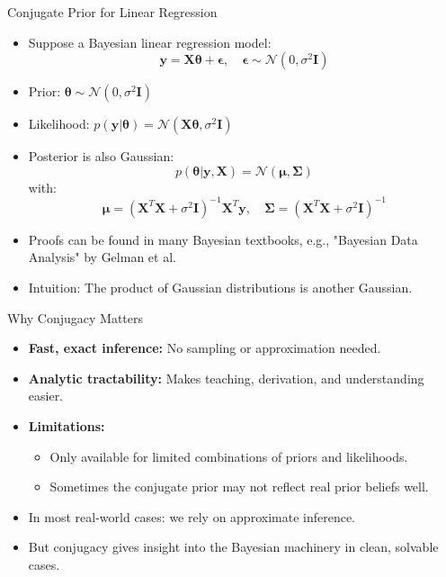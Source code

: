 \documentclass{beamer}
\begin{document}
\begin{frame}{Conjugate Prior for Linear Regression}
  \begin{itemize}
    \item Suppose a Bayesian linear regression model:
      \[
        \bm{y} = \bm{X}\bm{\theta} + \bm{\epsilon}, \quad \bm{\epsilon} \sim \mathcal{N}(0, \sigma^2 \bm{I})
      \]
    \item Prior: \( \bm{\theta} \sim \mathcal{N}(0, \sigma^2 \bm{I}) \)
    \item Likelihood: \( p(\bm{y} | \bm{\theta}) = \mathcal{N}(\bm{X}\bm{\theta}, \sigma^2 \bm{I}) \)
    \item Posterior is also Gaussian:
      \[
        p(\bm{\theta} | \bm{y}, \bm{X}) = \mathcal{N}(\bm{\mu}, \bm{\Sigma})
      \]
      with:
      \[
        \bm{\mu} = (\bm{X}^T \bm{X} + \sigma^2 \bm{I})^{-1} \bm{X}^T \bm{y}, \quad
        \bm{\Sigma} = (\bm{X}^T \bm{X} + \sigma^2 \bm{I})^{-1}
      \]
    \end{itemize}
    \begin{itemize}
    \item Proofs can be found in many Bayesian textbooks, e.g., "Bayesian Data Analysis" by Gelman et al.
    \item{Intuition:} The product of Gaussian distributions is another Gaussian.
      \end{itemize}
\end{frame}

\begin{frame}{Why Conjugacy Matters}
  \begin{itemize}
    \item \textbf{Fast, exact inference:} No sampling or approximation needed.
    \item \textbf{Analytic tractability:} Makes teaching, derivation, and understanding easier.
    \item \textbf{Limitations:}
      \begin{itemize}
        \item Only available for limited combinations of priors and likelihoods.
        \item Sometimes the conjugate prior may not reflect real prior beliefs well.
      \end{itemize}
    \item In most real-world cases: we rely on approximate inference.
    \item But conjugacy gives insight into the Bayesian machinery in clean, solvable cases.
  \end{itemize}
\end{frame}
\end{document}

